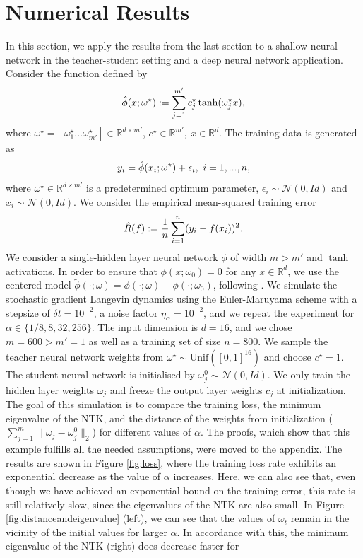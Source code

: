 \documentclass[10pt]{article} %
\newcommand{\R}{\mathbb{R}}
\newcommand{\bR}{\mathbb{R}}
\newcommand{\cN}{\mathcal{N}}
\begin{document}
\section{Numerical Results}\label{section:nr}
In this section, we apply the results from the last section to a shallow neural network in the teacher-student setting and a deep neural network application. Consider the function defined by 
\begin{equation*}
    \Hat{\phi}(x;\omega^\star):=\sum_{j=1}^{m'} c^\star_j\tanh(\omega^\star_j x),
\end{equation*}
where $\omega^\star = [\omega_1^\star \ldots \omega^\star_{m'}]\in\bR^{d\times m'}$, $c^\star\in\R^{m'}, \ x\in\R^d$. The training data is generated as 
\begin{equation*}
    y_i=\Hat{\phi}(x_i;\omega^\star)+\epsilon_i, \ i=1,...,n,
\end{equation*}
where $\omega^\star\in\R^{d\times m'}$ is a predetermined optimum parameter, $\epsilon_i\sim \cN(0,Id)$ and $x_i\sim\cN(0,Id)$. We consider the empirical mean-squared training error $$\Hat{R}(f):=\frac{1}{n}\sum_{i=1}^n(y_i-f(x_i))^2.$$ We consider a single-hidden layer neural network $\phi$ of width $m>m'$ and $\tanh$ activations. In order to ensure that $\phi(x;\omega_0)=0$ for any $x\in\bR^d$, we use the centered model $\tilde{\phi}(\cdot;\omega)=\phi(\cdot;\omega)-\phi(\cdot;\omega_0)$, following \cite{ChizatBachlazyTraining}. We simulate the stochastic gradient Langevin dynamics using the Euler-Maruyama scheme with a stepsize of $\delta t=10^{-2}$, a noise factor $\eta_\alpha=10^{-2}$, and we repeat the experiment for $\alpha\in\{1/8,8,32,256\}$. The input dimension is $ d=16$, and we chose $m=600 > m'=1$ as well as a training set of size $n=800$. We sample the teacher neural network weights from $\omega^\star\sim \mathrm{Unif} ([0,1]^{16})$ and choose $c^\star=1$. The student neural network is initialised by $\omega_j^0\sim \cN(0,Id)$. We only train the hidden layer weights $\omega_j$ and freeze the output layer weights $c_j$ at initialization. The goal of this simulation is to compare the training loss, the minimum eigenvalue of the NTK, and the distance of the weights from initialization ($\sum_{j=1}^m\|\omega_j-\omega_j^0\|_2$) for different values of $\alpha$. The proofs, which show that this example fulfills all the needed assumptions, were moved to the appendix. The results are shown in Figure \ref{fig:loss}, where the training loss rate exhibits an exponential decrease as the value of $\alpha$ increases. Here, we can also see that, even though we have achieved an exponential bound on the training error, this rate is still relatively slow, since the eigenvalues of the NTK are also small. In Figure \ref{fig:distanceandeigenvalue} (left), we can see that the values of $\omega_t$ remain in the vicinity of the initial values for larger $\alpha$. In accordance with this, the minimum eigenvalue of the NTK (right) does decrease faster for 
\end{document}
